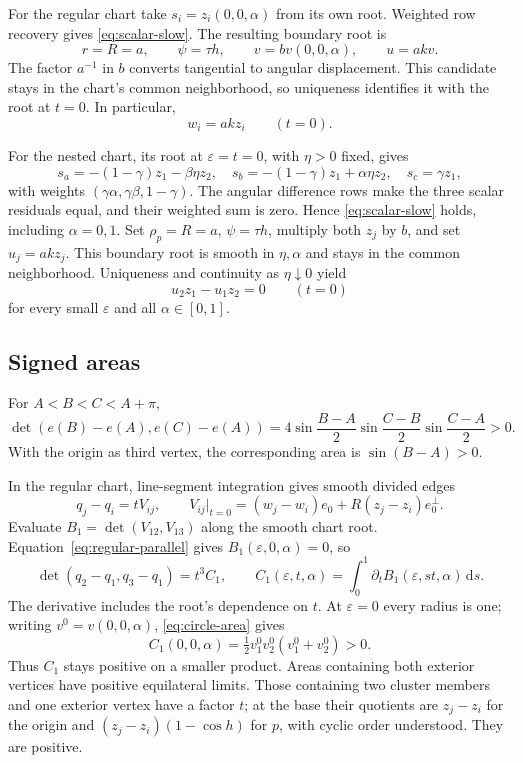 \documentclass[11pt,a4paper]{article}
\numberwithin{equation}{section}
\theoremstyle{remark}
\newcommand{\eps}{\varepsilon}
\newcommand{\dd}{\,\mathrm d}
\begin{document}
For the regular chart take $s_i=z_i(0,0,\alpha)$ from its own root.
Weighted row recovery gives \eqref{eq:scalar-slow}. The resulting boundary root is
\begin{equation}\label{eq:regular-slow}
 r=R=a,\qquad \psi=\tau h,\qquad
 v=bv(0,0,\alpha),\qquad u=akv.
\end{equation}
The factor $a^{-1}$ in $b$ converts tangential to angular displacement.
This candidate stays in the chart's common neighborhood, so uniqueness identifies it with the root at $t=0$. In particular,
\begin{equation}\label{eq:regular-parallel}
 w_i=akz_i\qquad(t=0).
\end{equation}

For the nested chart, its root at $\eps=t=0$, with $\eta>0$ fixed, gives
\[
 s_a=-(1-\gamma)z_1-\beta\eta z_2,\quad
 s_b=-(1-\gamma)z_1+\alpha\eta z_2,\quad s_c=\gamma z_1,
\]
with weights $(\gamma\alpha,\gamma\beta,1-\gamma)$.
The angular difference rows make the three scalar residuals equal, and their weighted sum is zero. Hence \eqref{eq:scalar-slow} holds, including $\alpha=0,1$.
Set $\rho_p=R=a$, $\psi=\tau h$, multiply both $z_j$ by $b$, and set $u_j=akz_j$.
This boundary root is smooth in $\eta,\alpha$ and stays in the common neighborhood.
Uniqueness and continuity as $\eta\downarrow0$ yield
\begin{equation}\label{eq:nest-parallel}
 u_2z_1-u_1z_2=0\qquad(t=0)
\end{equation}
for every small $\eps$ and all $\alpha\in[0,1]$.

\subsection{Signed areas}
For $A<B<C<A+\pi$,
\begin{equation}\label{eq:circle-area}
 \det(e(B)-e(A),e(C)-e(A))
 =4\sin\frac{B-A}2\sin\frac{C-B}2\sin\frac{C-A}2>0.
\end{equation}
With the origin as third vertex, the corresponding area is $\sin(B-A)>0$.

In the regular chart, line-segment integration gives smooth divided edges
\[
 q_j-q_i=tV_{ij},\qquad
 V_{ij}|_{t=0}=(w_j-w_i)e_0+R(z_j-z_i)e_0^\perp.
\]
Evaluate $B_1=\det(V_{12},V_{13})$ along the smooth chart root.
Equation~\eqref{eq:regular-parallel} gives $B_1(\eps,0,\alpha)=0$, so
\begin{equation}\label{eq:regular-area}
 \det(q_2-q_1,q_3-q_1)=t^3C_1,\qquad
 C_1(\eps,t,\alpha)=\int_0^1\partial_tB_1(\eps,st,\alpha)\dd s.
\end{equation}
The derivative includes the root's dependence on $t$.
At $\eps=0$ every radius is one; writing $v^0=v(0,0,\alpha)$, \eqref{eq:circle-area} gives
\[
 C_1(0,0,\alpha)=\tfrac12v^0_1v^0_2(v^0_1+v^0_2)>0.
\]
Thus $C_1$ stays positive on a smaller product.
Areas containing both exterior vertices have positive equilateral limits.
Those containing two cluster members and one exterior vertex have a factor $t$; at the base their quotients are $z_j-z_i$ for the origin and $(z_j-z_i)(1-\cos h)$ for $p$, with cyclic order understood. They are positive.
\end{document}
